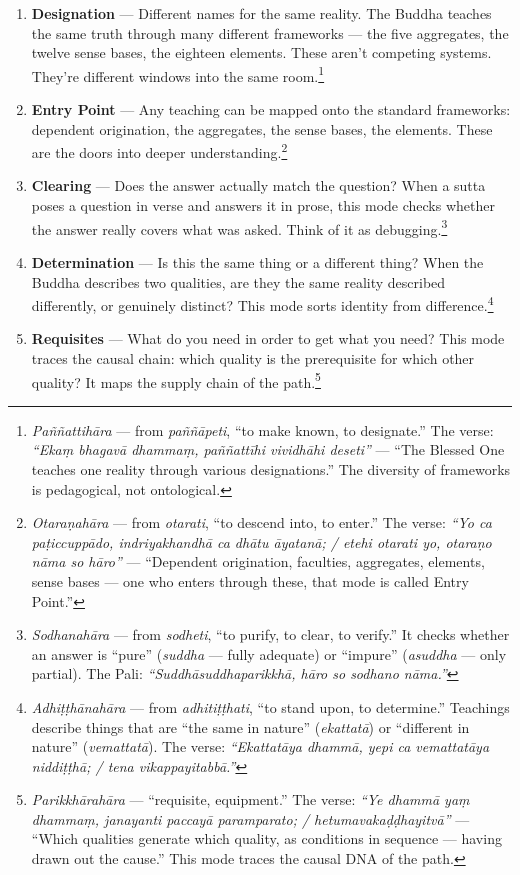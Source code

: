 \begin{enumerate}[leftmargin=*, itemsep=8pt]
\item \textbf{Designation} --- Different names for the same reality. The Buddha teaches the same truth through many different frameworks --- the five aggregates, the twelve sense bases, the eighteen elements. These aren't competing systems. They're different windows into the same room.\footnote{\textit{Paññattihāra} --- from \textit{paññāpeti}, ``to make known, to designate.'' The verse: \textit{``Ekaṃ bhagavā dhammaṃ, paññattīhi vividhāhi deseti''} --- ``The Blessed One teaches one reality through various designations.'' The diversity of frameworks is pedagogical, not ontological.}

\item \textbf{Entry Point} --- Any teaching can be mapped onto the standard frameworks: dependent origination, the aggregates, the sense bases, the elements. These are the doors into deeper understanding.\footnote{\textit{Otaraṇahāra} --- from \textit{otarati}, ``to descend into, to enter.'' The verse: \textit{``Yo ca paṭiccuppādo, indriyakhandhā ca dhātu āyatanā; / etehi otarati yo, otaraṇo nāma so hāro''} --- ``Dependent origination, faculties, aggregates, elements, sense bases --- one who enters through these, that mode is called Entry Point.''}

\item \textbf{Clearing} --- Does the answer actually match the question? When a sutta poses a question in verse and answers it in prose, this mode checks whether the answer really covers what was asked. Think of it as debugging.\footnote{\textit{Sodhanahāra} --- from \textit{sodheti}, ``to purify, to clear, to verify.'' It checks whether an answer is ``pure'' (\textit{suddha} --- fully adequate) or ``impure'' (\textit{asuddha} --- only partial). The Pali: \textit{``Suddhāsuddhaparikkhā, hāro so sodhano nāma.''}}

\item \textbf{Determination} --- Is this the same thing or a different thing? When the Buddha describes two qualities, are they the same reality described differently, or genuinely distinct? This mode sorts identity from difference.\footnote{\textit{Adhiṭṭhānahāra} --- from \textit{adhitiṭṭhati}, ``to stand upon, to determine.'' Teachings describe things that are ``the same in nature'' (\textit{ekattatā}) or ``different in nature'' (\textit{vemattatā}). The verse: \textit{``Ekattatāya dhammā, yepi ca vemattatāya niddiṭṭhā; / tena vikappayitabbā.''}}

\item \textbf{Requisites} --- What do you need in order to get what you need? This mode traces the causal chain: which quality is the prerequisite for which other quality? It maps the supply chain of the path.\footnote{\textit{Parikkhārahāra} --- ``requisite, equipment.'' The verse: \textit{``Ye dhammā yaṃ dhammaṃ, janayanti paccayā paramparato; / hetumavakaḍḍhayitvā''} --- ``Which qualities generate which quality, as conditions in sequence --- having drawn out the cause.'' This mode traces the causal DNA of the path.}


\end{enumerate}
